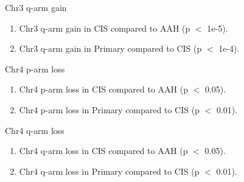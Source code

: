 \documentclass{beamer}
\begin{document}
\begin{frame}[allowframebreaks]
        \begin{block}{Chr3 q-arm gain}
            \begin{enumerate}
                \item Chr3 q-arm gain in CIS compared to AAH (p $<$ 1e-5).
                \item Chr3 q-arm gain in Primary compared to CIS (p $<$ 1e-4).
            \end{enumerate}

            \begin{table}
                \caption{CGC Tier1 genes in Chr3 q-arm}
                \resizebox{\linewidth}{!}
                {}
            \end{table}
        \end{block}

        \begin{block}{Chr4 p-arm loss}
            \begin{enumerate}
                \item Chr4 p-arm loss in CIS compared to AAH (p $<$ 0.05).
                \item Chr4 p-arm loss in Primary compared to CIS (p $<$ 0.01).
            \end{enumerate}

            \begin{table}
                \caption{CGC Tier1 genes in Chr4 p-arm}
                \resizebox{\linewidth}{!}
                {}
            \end{table}
        \end{block}

        \begin{block}{Chr4 q-arm loss}
            \begin{enumerate}
                \item Chr4 q-arm loss in CIS compared to AAH (p $<$ 0.05).
                \item Chr4 q-arm loss in Primary compared to CIS (p $<$ 0.01).
            \end{enumerate}

            \begin{table}
                \caption{CGC Tier1 genes in Chr4 q-arm}
                \resizebox{\linewidth}{!}
                {}
            \end{table}
        \end{block}


\end{frame}
\end{document}
